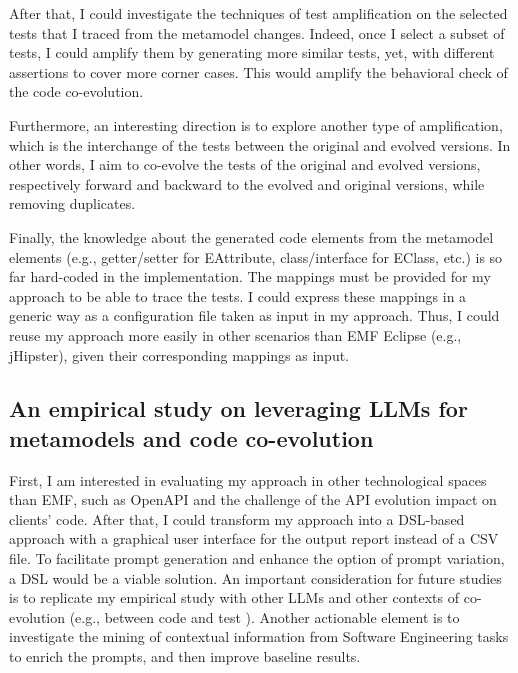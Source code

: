After that, I could investigate the techniques of test amplification on the selected tests that I traced from the metamodel changes. Indeed, once I select a subset of tests, I could amplify them by generating more similar tests, yet, with different assertions to cover more corner cases. This would amplify the behavioral check of the code co-evolution. 

Furthermore, an interesting direction is to explore another type of amplification, which is the interchange of the tests between the original and evolved versions. In other words, I aim to co-evolve the tests of the original and evolved versions, respectively forward and backward to the evolved and original versions, while removing duplicates. 

Finally, the knowledge about the generated code elements from the metamodel elements (e.g., getter/setter for EAttribute, class/interface for EClass, etc.) is so far hard-coded in the implementation. The mappings must be provided for my approach to be able to trace the tests. I could express these mappings in a generic way as a configuration file taken as input in my approach. Thus, I could reuse my approach more easily in other scenarios than EMF Eclipse (e.g., jHipster), given their corresponding mappings as input. 

 

 




\subsection{An empirical study on leveraging LLMs for metamodels and code co-evolution}


First, I am interested in evaluating my approach in other technological spaces than EMF, such as OpenAPI and the challenge of the API evolution impact on clients' code. After that, I could transform my approach into a DSL-based approach with a graphical user interface for the output report instead of a CSV file. To facilitate prompt generation and enhance the option of prompt variation, a DSL would be a viable solution. An important consideration for future studies is to replicate my empirical study with other LLMs and other contexts of co-evolution (e.g., between code and test \cite{le2021untangling}). Another actionable element is to investigate the mining of contextual information from Software Engineering tasks to enrich the prompts, and then improve baseline results.

